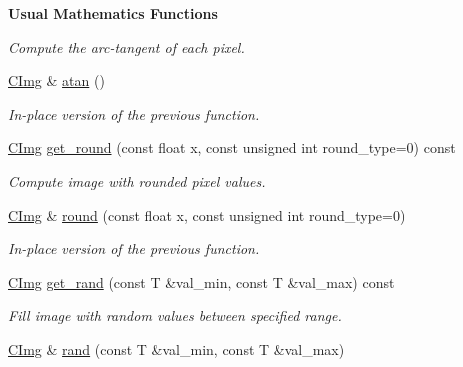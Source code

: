 \begin{Indent}{\bf Usual Mathematics Functions}
\begin{DoxyCompactItemize}
\begin{DoxyCompactList}\small\item\em Compute the arc-\/tangent of each pixel. \end{DoxyCompactList}\item 
\hypertarget{structcimg__library_1_1_c_img_aeb862973f2dc1409d7f512a6b1451748}{\hyperlink{structcimg__library_1_1_c_img}{C\-Img} \& \hyperlink{structcimg__library_1_1_c_img_aeb862973f2dc1409d7f512a6b1451748}{atan} ()}\label{structcimg__library_1_1_c_img_aeb862973f2dc1409d7f512a6b1451748}

\begin{DoxyCompactList}\small\item\em In-\/place version of the previous function. \end{DoxyCompactList}\item 
\hyperlink{structcimg__library_1_1_c_img}{C\-Img} \hyperlink{structcimg__library_1_1_c_img_a13739baf4ed5d92e03463127a7e14768}{get\-\_\-round} (const float x, const unsigned int round\-\_\-type=0) const 
\begin{DoxyCompactList}\small\item\em Compute image with rounded pixel values. \end{DoxyCompactList}\item 
\hypertarget{structcimg__library_1_1_c_img_afc1a4ffb591540103f80b06f6a4faf84}{\hyperlink{structcimg__library_1_1_c_img}{C\-Img} \& \hyperlink{structcimg__library_1_1_c_img_afc1a4ffb591540103f80b06f6a4faf84}{round} (const float x, const unsigned int round\-\_\-type=0)}\label{structcimg__library_1_1_c_img_afc1a4ffb591540103f80b06f6a4faf84}

\begin{DoxyCompactList}\small\item\em In-\/place version of the previous function. \end{DoxyCompactList}\item 
\hypertarget{structcimg__library_1_1_c_img_a686f6adb41a450f6207110416806cd90}{\hyperlink{structcimg__library_1_1_c_img}{C\-Img} \hyperlink{structcimg__library_1_1_c_img_a686f6adb41a450f6207110416806cd90}{get\-\_\-rand} (const T \&val\-\_\-min, const T \&val\-\_\-max) const }\label{structcimg__library_1_1_c_img_a686f6adb41a450f6207110416806cd90}

\begin{DoxyCompactList}\small\item\em Fill image with random values between specified range. \end{DoxyCompactList}\item 
\hypertarget{structcimg__library_1_1_c_img_aafb13f1ae24da56057fd11975c12f6a6}{\hyperlink{structcimg__library_1_1_c_img}{C\-Img} \& \hyperlink{structcimg__library_1_1_c_img_aafb13f1ae24da56057fd11975c12f6a6}{rand} (const T \&val\-\_\-min, const T \&val\-\_\-max)}\label{structcimg__library_1_1_c_img_aafb13f1ae24da56057fd11975c12f6a6}


\end{DoxyCompactItemize}
\end{Indent}
